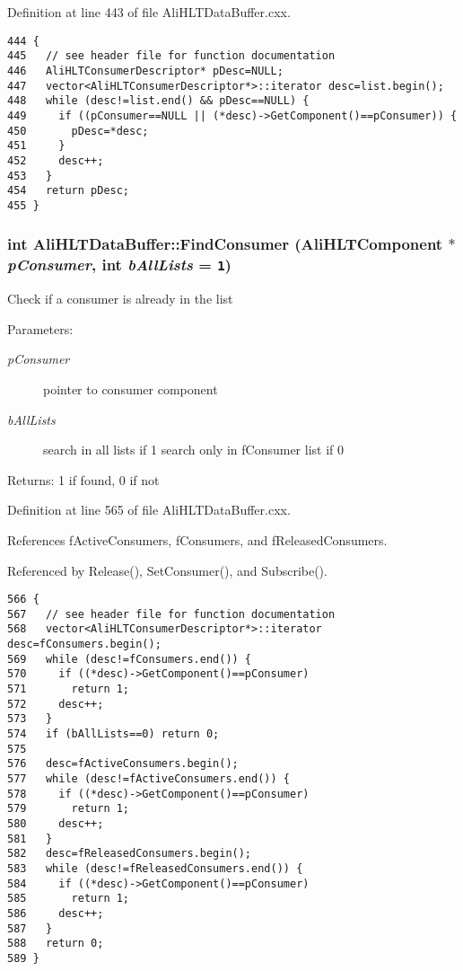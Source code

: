 Definition at line 443 of file Ali\-HLTData\-Buffer.cxx.

\footnotesize\begin{verbatim}444 {
445   // see header file for function documentation
446   AliHLTConsumerDescriptor* pDesc=NULL;
447   vector<AliHLTConsumerDescriptor*>::iterator desc=list.begin();
448   while (desc!=list.end() && pDesc==NULL) {
449     if ((pConsumer==NULL || (*desc)->GetComponent()==pConsumer)) {
450       pDesc=*desc;
451     }
452     desc++;
453   }
454   return pDesc;
455 }
\end{verbatim}\normalsize 


\subsubsection{\setlength{\rightskip}{0pt plus 5cm}int Ali\-HLTData\-Buffer::Find\-Consumer ({\bf Ali\-HLTComponent} $\ast$ {\em p\-Consumer}, int {\em b\-All\-Lists} = {\tt 1})}\label{classAliHLTDataBuffer_a14}


Check if a consumer is already in the list \begin{Desc}
\item[Parameters:]
\begin{description}
\item[{\em p\-Consumer}]pointer to consumer component \item[{\em b\-All\-Lists}]search in all lists if 1 search only in f\-Consumer list if 0 \end{description}
\end{Desc}
\begin{Desc}
\item[Returns:]1 if found, 0 if not \end{Desc}


Definition at line 565 of file Ali\-HLTData\-Buffer.cxx.

References f\-Active\-Consumers, f\-Consumers, and f\-Released\-Consumers.

Referenced by Release(), Set\-Consumer(), and Subscribe().

\footnotesize\begin{verbatim}566 {
567   // see header file for function documentation
568   vector<AliHLTConsumerDescriptor*>::iterator desc=fConsumers.begin();
569   while (desc!=fConsumers.end()) {
570     if ((*desc)->GetComponent()==pConsumer)
571       return 1;
572     desc++;
573   }
574   if (bAllLists==0) return 0;
575 
576   desc=fActiveConsumers.begin();
577   while (desc!=fActiveConsumers.end()) {
578     if ((*desc)->GetComponent()==pConsumer)
579       return 1;
580     desc++;
581   }
582   desc=fReleasedConsumers.begin();
583   while (desc!=fReleasedConsumers.end()) {
584     if ((*desc)->GetComponent()==pConsumer)
585       return 1;
586     desc++;
587   }
588   return 0;
589 }
\end{verbatim}\normalsize 


